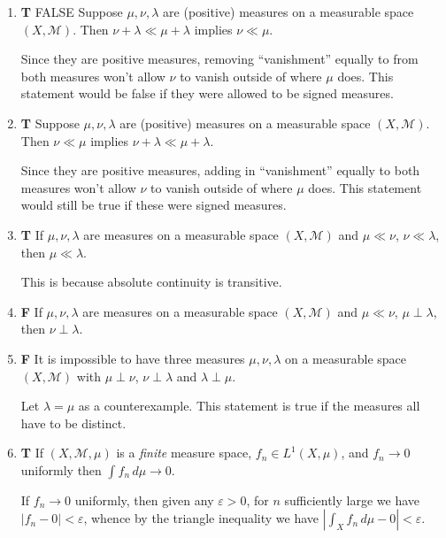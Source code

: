 \documentclass[11pt,oneside,english]{amsart}
\theoremstyle{definition}
\newcommand{\ve}{\varepsilon}
\newcommand{\MC}[1]{\mathcal{#1}}
\begin{document}
\begin{enumerate}
\item \textbf{T}  FALSE
Suppose $\mu,\nu,\lambda$ are (positive) measures on a measurable space $(X,\MC{M})$.  Then $\nu + \lambda \ll  \mu + \lambda $ implies $\nu \ll \mu$.

Since they are positive measures, removing ``vanishment'' equally to from both measures won't allow $\nu$ to vanish outside of where $\mu$ does. This statement would be false if they were allowed to be signed measures.

\item \textbf{T}  
Suppose $\mu,\nu,\lambda$ are (positive) measures on a measurable space $(X,\MC{M})$.  Then $\nu \ll \mu$ implies $\nu + \lambda \ll  \mu + \lambda$.

Since they are positive measures, adding in ``vanishment'' equally to both measures won't allow $\nu$ to vanish outside of where $\mu$ does. This statement would still be true if these were signed measures.

\item \textbf{T}  
If $\mu,\nu,\lambda$ are measures on a measurable space $(X,\MC{M})$ and $\mu \ll \nu$, $\nu \ll \lambda$, then $\mu \ll \lambda$.  

This is because absolute continuity is transitive.

\item \textbf{F}
If $\mu,\nu,\lambda$ are measures on a measurable space $(X,\MC{M})$ and $\mu \ll \nu$, $\mu \perp \lambda$, then $\nu \perp \lambda$.  


\item \textbf{F} 
It is impossible to have three measures $\mu,\nu,\lambda$ on a measurable space $(X,\MC{M})$ with $\mu \perp \nu$, $\nu \perp \lambda$ and $\lambda \perp \mu$.

Let $\lambda=\mu$ as a counterexample. This statement is true if the measures all have to be distinct.

\item \textbf{T} 
If $(X,\MC{M},\mu)$ is a \emph{finite} measure space, $f_n \in L^1(X,\mu)$, and $f_n \to 0$ uniformly then $\int f_n\,d\mu \to 0$.

If $f_n\to0$ uniformly, then given any $\ve>0$, for $n$ sufficiently large we have $|f_n-0|<\ve$, whence by the triangle inequality we have $\left|\int_X f_n\,d\mu-0\right|<\ve$.


\end{enumerate}
\end{document}
